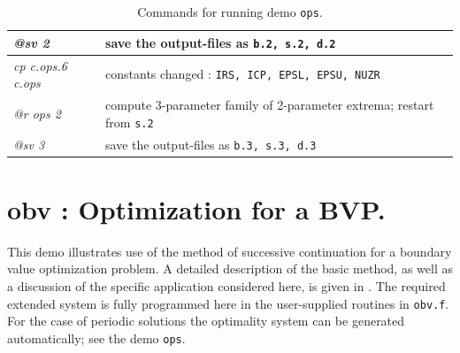 \documentclass[12pt]{report}
\begin{document}
\begin{table}[htbp]
\begin{center}
\begin{tabular}{| l | l |}
  {\it @sv 2} & save the output-files as {\tt b.2, s.2, d.2} \\ 
\hline
  {\it cp c.ops.6 c.ops} & constants changed : {\tt IRS, ICP, EPSL, EPSU, NUZR} \\ 
  {\it @r ops 2} & compute 3-parameter family of 2-parameter extrema; restart from {\tt s.2} \\ 
  {\it @sv 3} & save the output-files as {\tt b.3, s.3, d.3} \\ 
\hline
\end{tabular}
\caption{Commands for running demo {\tt ops}.}
\label{tbl:demo_ops_4}
\end{center}
\end{table}

\newpage
\section{ obv : Optimization for a BVP.} \label{sec:Demos_obv}
This demo illustrates use of the method of successive continuation
for a  boundary value optimization problem.
A detailed description of the basic method, as well as a discussion
of the specific application considered here, is given in 
 \citeyear{DoKeKe:91b}.
The required extended system is fully programmed here in the user-supplied
routines in {\tt obv.f}.
For the case of periodic solutions the optimality system can be generated
automatically; see the demo {\tt ops}.
\end{document}
